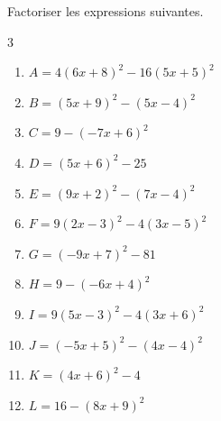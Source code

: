 {%
\begin{Exercice}%
Factoriser les expressions suivantes.
\begin{multicols}{3}
\begin{enumerate}[itemsep=1em,label={}]
	\item \begin{minipage}[t]{\linewidth}$A = 4(6x+8)^2-16(5x+5)^2$\end{minipage}
	\item \begin{minipage}[t]{\linewidth}$B = (5x+9)^2-(5x-4)^2$\end{minipage}
	\item \begin{minipage}[t]{\linewidth}$C = 9-(-7x+6)^2$\end{minipage}
	\item \begin{minipage}[t]{\linewidth}$D = (5x+6)^2-25$\end{minipage}
	\item \begin{minipage}[t]{\linewidth}$E = (9x+2)^2-(7x-4)^2$\end{minipage}
	\item \begin{minipage}[t]{\linewidth}$F = 9(2x-3)^2-4(3x-5)^2$\end{minipage}
	\item \begin{minipage}[t]{\linewidth}$G = (-9x+7)^2-81$\end{minipage}
	\item \begin{minipage}[t]{\linewidth}$H = 9-(-6x+4)^2$\end{minipage}
	\item \begin{minipage}[t]{\linewidth}$I = 9(5x-3)^2-4(3x+6)^2$\end{minipage}
	\item \begin{minipage}[t]{\linewidth}$J = (-5x+5)^2-(4x-4)^2$\end{minipage}
	\item \begin{minipage}[t]{\linewidth}$K = (4x+6)^2-4$\end{minipage}
	\item \begin{minipage}[t]{\linewidth}$L = 16-(8x+9)^2$\end{minipage}
\end{enumerate}
\end{multicols}
\end{Exercice}

}
